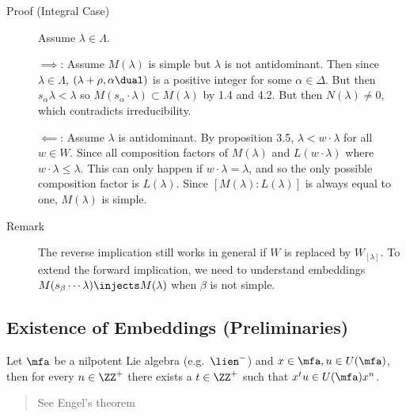 \begin{description}
\item[Proof (Integral Case)]
Assume \(\lambda \in \Lambda\).

\(\implies\): Assume \(M(\lambda)\) is simple but \(\lambda\) is not
antidominant. Then since \(\lambda \in \Lambda\),
\((\lambda + \rho, \alpha\dual)\) is a positive integer for some
\(\alpha \in \Delta\). But then \(s_\alpha \lambda < \lambda\) so
\(M(s_\alpha \cdot \lambda) \subset M(\lambda)\) by 1.4 and 4.2. But
then \(N(\lambda) \neq 0\), which contradicts irreducibility.

\(\impliedby\): Assume \(\lambda\) is antidominant. By proposition 3.5,
\(\lambda < w\cdot \lambda\) for all \(w\in W\). Since all composition
factors of \(M(\lambda)\) and \(L(w\cdot \lambda)\) where
\(w\cdot \lambda \leq \lambda\). This can only happen if
\(w\cdot \lambda = \lambda\), and so the only possible composition
factor is \(L(\lambda)\). Since \([M(\lambda) : L(\lambda)]\) is always
equal to one, \(M(\lambda)\) is simple.
\item[Remark]
The reverse implication still works in general if \(W\) is replaced by
\(W_{[\lambda]}\). To extend the forward implication, we need to
understand embeddings \(M(s_\beta \cdots \lambda) \injects M(\lambda)\)
when \(\beta\) is not simple.
\end{description}

\hypertarget{existence-of-embeddings-preliminaries}{%
\subsection{Existence of Embeddings
(Preliminaries)}\label{existence-of-embeddings-preliminaries}}

\begin{description}
\tightlist
\item[Lemma (Commuting Nilpotents)]
Let \(\mfa\) be a nilpotent Lie algebra (e.g.~\(\lien^-\)) and
\(x\in \mfa, u\in U(\mfa)\), then for every \(n\in \ZZ^+\) there exists
a \(t\in \ZZ^+\) such that \(x^t u \in U(\mfa) x^n\).
\end{description}

\begin{quote}
See Engel's theorem
\end{quote}

